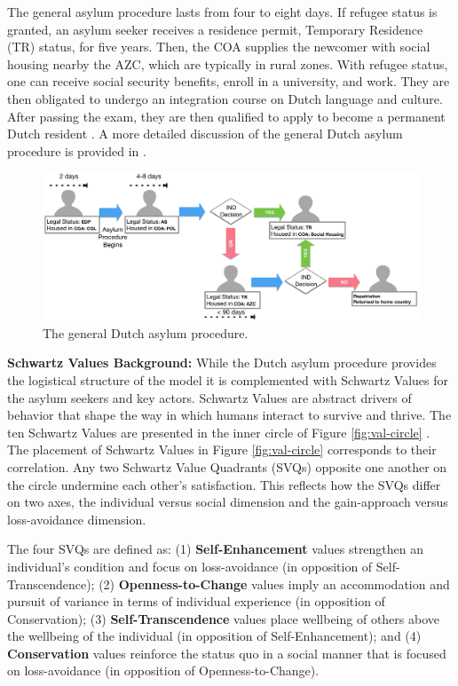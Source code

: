 \documentclass{scspaperproc}
\theoremstyle{scsthe}
\begin{document}
The general asylum procedure lasts from four to eight days. If refugee status is granted, an asylum seeker receives a residence permit, Temporary Residence (TR) status, for five years. Then, the COA supplies the newcomer with social housing nearby the AZC, which are typically in rural zones. With refugee status, one can receive social security benefits, enroll in a university, and work. They are then obligated to undergo an integration course on Dutch language and culture. After passing the exam, they are then qualified to apply to become a permanent Dutch resident \cite{9}. A more detailed discussion of the general Dutch asylum procedure is provided in \cite{phil.masters.thesis}.

\begin{figure}[htb]
{
\centering
\includegraphics[width=0.65\columnwidth]{Asylum-Procedure.png}
\caption{The general Dutch asylum procedure.}
\label{fig:asy-proc}
}
\end{figure}

{\bf Schwartz Values Background:} While the Dutch asylum procedure provides the logistical structure of the model it is complemented with Schwartz Values for the asylum seekers and key actors. Schwartz Values are abstract drivers of behavior that shape the way in which humans interact to survive and thrive. The ten Schwartz Values are presented in the inner circle of Figure \ref{fig:val-circle} \cite{76}. The placement of Schwartz Values in Figure \ref{fig:val-circle} corresponds to their correlation. Any two Schwartz Value Quadrants (SVQs) opposite one another on the circle undermine each other's satisfaction. This reflects how the SVQs differ on two axes, the individual versus social dimension and the gain-approach versus loss-avoidance dimension. 

The four SVQs are defined as: (1) {\bf Self-Enhancement} values strengthen an individual's condition and focus on loss-avoidance (in opposition of Self-Transcendence); (2)  {\bf Openness-to-Change} values imply an accommodation and pursuit of variance in terms of individual experience (in opposition of Conservation); (3) {\bf Self-Transcendence} values place wellbeing of others above the wellbeing of the individual (in opposition of Self-Enhancement); and (4) {\bf Conservation} values reinforce the status quo in a social manner that is focused on loss-avoidance (in opposition of Openness-to-Change).
\end{document}
